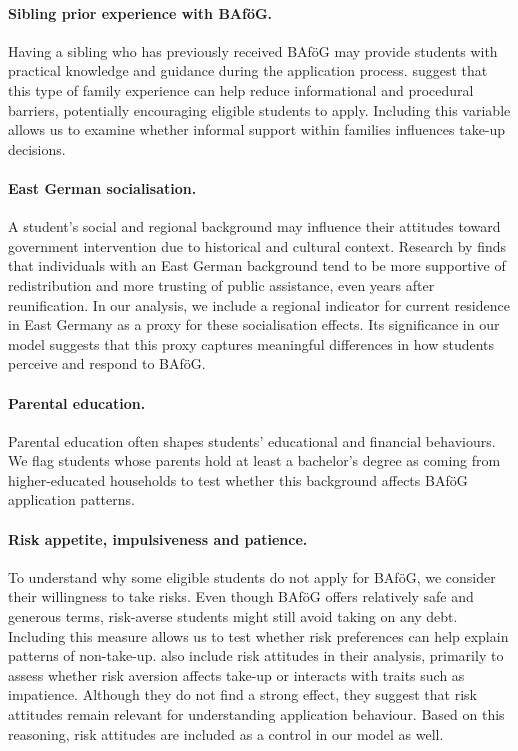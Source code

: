 \paragraph{Sibling prior experience with BAföG.}
Having a sibling who has previously received BAföG may provide students with practical knowledge and guidance during the application process. \cite{herber_non-take-up_2019} suggest that this type of family experience can help reduce informational and procedural barriers, potentially encouraging eligible students to apply. Including this variable allows us to examine whether informal support within families influences take-up decisions.

\paragraph{East German socialisation.}  
A student’s social and regional background may influence their attitudes toward government intervention due to historical and cultural context. Research by \cite{alesina_good-bye_2007} finds that individuals with an East German background tend to be more supportive of redistribution and more trusting of public assistance, even years after reunification. In our analysis, we include a regional indicator for current residence in East Germany as a proxy for these socialisation effects. Its significance in our model suggests that this proxy captures meaningful differences in how students perceive and respond to BAföG.

\paragraph{Parental education.}  
Parental education often shapes students’ educational and financial behaviours. We flag students whose parents hold at least a bachelor’s degree as coming from higher-educated households to test whether this background affects BAföG application patterns.

\paragraph{Risk appetite, impulsiveness and patience.}  

To understand why some eligible students do not apply for BAföG, we consider their willingness to take risks. 
Even though BAföG offers relatively safe and generous terms, risk-averse students might still avoid taking on any debt. 
Including this measure allows us to test whether risk preferences can help explain patterns of non-take-up. 
\cite{herber_non-take-up_2019} also include risk attitudes in their analysis, primarily to assess whether risk aversion affects take-up or interacts with traits such as impatience. Although they do not find a strong effect, they suggest that risk attitudes remain relevant for understanding application behaviour. 
Based on this reasoning, risk attitudes are included as a control in our model as well.

